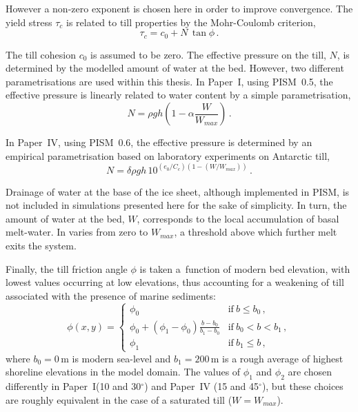 \documentclass{article}
\newcommand{\CCLI}[0]{Paper~I}      %
\newcommand{\CCYC}[0]{Paper~IV}     %
\begin{document}
However a non-zero exponent is chosen here in order to improve convergence. The
yield stress $\tau_c$ is related to till properties by the Mohr-Coulomb
criterion,
\begin{equation}
   \tau_c = c_0 + N\,\tan{\phi} \,.
\end{equation}

The till cohesion $c_0$ is assumed to be zero. The effective pressure on the
till, $N$, is determined by the modelled amount of water at the bed. However,
two different parametrisations are used within this thesis. In {\CCLI}, using
PISM~0.5, the effective pressure is linearly related to water content by a
simple parametrisation,
\begin{equation}
    N = \rho gh (1 - \alpha \frac{W}{W_{max}}) \,.
\end{equation}

In {\CCYC}, using PISM~0.6, the effective pressure is determined by an
empirical parametrisation based on laboratory experiments on Antarctic till,
\begin{equation}
    N = \delta \rho gh \, 10^{(e_0/C_c) (1 - (W/W_{max}))} \,.
\end{equation}

Drainage of water at the base of the ice sheet, although implemented in PISM,
is not included in simulations presented here for the sake of simplicity.
In turn, the amount of water at the bed, $W$, corresponds to the local
accumulation of basal melt-water. In varies from zero to $W_{max}$, a threshold
above which further melt exits the system.

Finally, the till friction angle $\phi$ is taken a~function of modern bed
elevation, with lowest values occurring at low elevations, thus accounting for
a weakening of till associated with the presence of marine sediments:
\begin{equation}
    \phi(x,y) =
    \begin{cases}
        \phi_0 & \text{if}\ b \le b_0 \,, \\
        \phi_0 + (\phi_1-\phi_0) \frac{b - b_0}{b_1-b_0}
                & \text{if}\ b_0 < b < b_1 \,, \\
        \phi_1 & \text{if}\ b_1 \le b \,,
    \end{cases}
\end{equation}
where $b_0=0$\,m is modern sea-level and $b_1=200$\,m is a rough average of
highest shoreline elevations in the model domain. The values of $\phi_1$ and
$\phi_2$ are chosen differently in \CCLI (10 and 30$^\circ$) and \CCYC
(15 and 45$^\circ$), but these choices are roughly equivalent in the case of a
saturated till ($W=W_{max}$).
\end{document}
